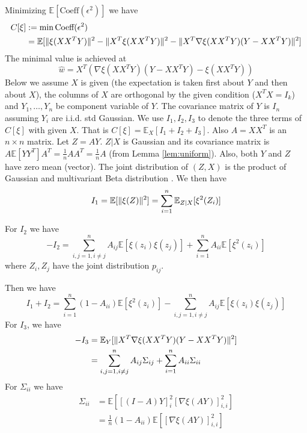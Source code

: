 \documentclass{article}
\DeclarePairedDelimiter\norm{\lVert}{\rVert}
\def\E{\mathbb{E}}
\begin{document}
Minimizing $\E[\textrm{Coeff}(\epsilon^2)]$ we have
\begin{align*}
C[\xi] &:= \min \textrm{Coeff}(\epsilon^2) \\
&=
\E[\norm{\xi(XX^TY)}^2 -
\norm{X^T\xi(XX^TY)}^2 -
\norm{X^T \nabla\xi(XX^TY)(Y-XX^TY)}^2]
\end{align*}
The minimal value is achieved at
$$
\hat{w} =  X^T(\nabla\xi(XX^T Y)
(Y-XX^T Y) - \xi(XX^T Y))
$$
Below we assume $X$ is given
(the expectation is taken first about $Y$ and then about $X$),
the columns of $X$ are orthogonal by the given condition
($X^TX=I_k$) and
$Y_1, \dots, Y_n $ be component variable of $Y$.
The covariance matrix of $Y$ is $I_n$ assuming $Y_i$ are i.i.d. std Gaussian.
We use $I_1, I_2, I_3$ to denote
the three terms of $C[\xi]$ with given $X$. That is
$C[\xi] = \E_X[I_1 + I_2 + I_3]$.
Also $A=XX^T$ is an $n\times n$ matrix.
Let $Z = AY$. $Z | X$ is Gaussian and
its covariance matrix is
$A\E[YY^T]A^T = \frac{1}{n}AA^T = \frac{1}{n}A$
(from Lemma \ref{lem:uniform}).
Also, both $Y$ and $Z$ have zero mean (vector).
The joint distribution of $(Z, X)$ is
the product of Gaussian and
multivariant Beta distribution \cite{eaton1989group}.
We then have
\begin{equation*}
I_1 =\E[\norm{\xi(Z)}^2] = \sum_{i=1}^n \E_{Z|X}[\xi^2(Z_i)]
\end{equation*}

For $I_2$
we have
\begin{equation*}
-I_2 = \sum_{i,j=1, i \neq j}^n A_{ij}\E[\xi(z_i)\xi(z_j)] +
\sum_{i=1}^n A_{ii}  \E[\xi^2(z_i)]
\end{equation*}
where $Z_i, Z_j$ have the joint distribution $p_{ij}$.

Then we have
\begin{equation}\label{eq:I1plusI2}
I_1+ I_2 = \sum_{i=1}^n (1-A_{ii}) \E[\xi^2(z_i)] -
\sum_{i,j=1, i \neq j}^n A_{ij}\E[\xi(z_i)\xi(z_j)]
\end{equation}
For $I_3$, we have
\begin{align*}
-I_3 & = \E_Y[\norm{X^T \nabla\xi(XX^TY)(Y-XX^TY)}^2] \\
& = \sum_{i,j=1, i \neq j}^n A_{ij}\Sigma_{ij} +
\sum_{i=1}^n A_{ii}\Sigma_{ii}
\end{align*}
For $\Sigma_{ii}$ we have
\begin{align}\label{eq:sigmaii}
\Sigma_{ii} &=  \E[ [(I-A)Y]_i^2 [\nabla \xi(AY)]_{i,i}^2] \\
&= \frac{1}{n}(1-A_{ii}) \E[ [\nabla \xi(AY)]_{i,i}^2]
\end{align}
\end{document}
